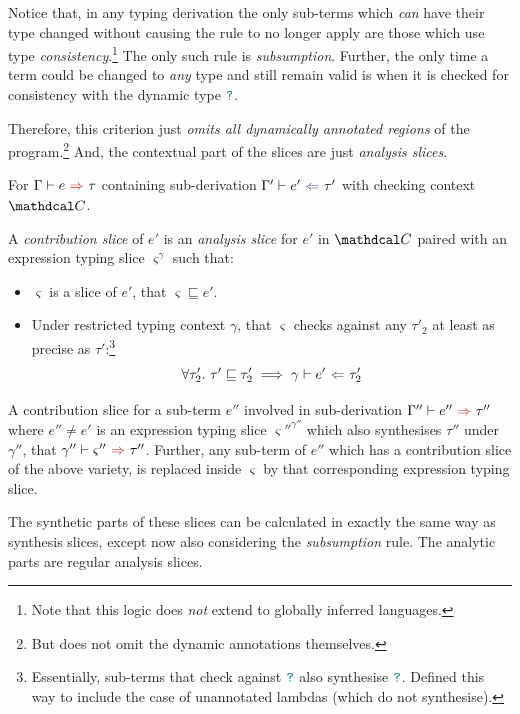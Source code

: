 Notice that, in any typing derivation the only sub-terms which \textit{can} have their type changed without causing the rule to no longer apply are those which use type \textit{consistency}.\footnote{Note that this logic does \textit{not} extend to globally inferred languages.} The only such rule is \textit{subsumption}. Further, the only time a term could be changed to \textit{any} type and still remain valid is when it is checked for consistency with the dynamic type ${\color{teal}\texttt{?}}$.

Therefore, this criterion just \textit{omits all dynamically annotated regions} of the program.\footnote{But does not omit the dynamic annotations themselves.} And, the contextual part of the slices are just \textit{analysis slices}.

\begin{definition}\label{def:ContributionSlice}
For $\synthesis{e}{\tau}$ containing sub-derivation $\analysis[\Gamma']{e'}{\tau'}$ with checking context $\C$.

A \textit{contribution slice} of $e'$ is an \textit{analysis slice} for $e'$ in $\C$ paired with an expression typing slice $\varsigma^\gamma$ such that:
\begin{itemize}
\item $\varsigma$ is a slice of $e'$, that $\varsigma \sqsubseteq e'$.
\item Under restricted typing context $\gamma$, that $\varsigma$ checks against any $\tau'_2$ at least as precise as $\tau'$:\footnote{Essentially, sub-terms that check against ${\color{teal}\texttt{?}}$ also synthesise ${\color{teal}\texttt{?}}$. Defined this way to include the case of unannotated lambdas (which do not synthesise).}
\[\forall \tau'_2.\ \tau' \sqsubseteq \tau'_2 \implies \analysis[\gamma]{e'}{\tau'_2}\]
\end{itemize}
A contribution slice for a sub-term $e''$ involved in sub-derivation $\synthesis[\Gamma'']{e''}{\tau''}$ where $e'' \neq e'$ is an expression typing slice $\varsigma''^{\gamma''}$ which also synthesises $\tau''$ under $\gamma''$, that $\synthesis[\gamma'']{\varsigma''}{\tau''}$. Further, any sub-term of $e''$ which has a contribution slice of the above variety, is replaced inside $\varsigma$ by that corresponding expression typing slice.
\end{definition} 
The synthetic parts of these slices can be calculated in exactly the same way as synthesis slices, except now also considering the \textit{subsumption} rule. The analytic parts are regular analysis slices.

